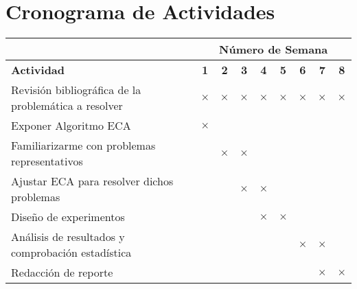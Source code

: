 \documentclass[12pt,letterpaper, xcolor=table, x11names]{article}
\newcommand{\tache}{$\boldsymbol{\times}$}
\begin{document}

\section{Cronograma de Actividades}

\begin{center}
	
\hspace{-1.0cm}
\begin{tabular}{|l|c|c|c|c|c|c|c|c|}
\hline \rowcolor{gray}
% 
&\multicolumn{8}{c}{\bf Número de Semana}\\ \hline
% 
{\bf Actividad } 
&{\bf 1}&{\bf 2}&{\bf 3}&{\bf 4} &{\bf 5}&{\bf 6}&{\bf 7}&{\bf 8} \\ \hline
Revisión bibliográfica de la problemática a resolver
& \tache  & \tache & \tache & \tache  & \tache & \tache & \tache & \tache \\ \hline
Exponer Algoritmo ECA
& \tache  &        &        &         &        &        &        &        \\ \hline
Familiarizarme con problemas representativos  
&         & \tache & \tache  &        &        &        &        &        \\ \hline
Ajustar ECA para resolver dichos problemas
&         &         & \tache & \tache &        &        &        &        \\ \hline
Diseño de experimentos
&          &        &        & \tache & \tache &        &        &        \\ \hline
Análisis de resultados y comprobación estadística
&          &        &        &        &        & \tache & \tache &        \\ \hline
Redacción de reporte
&          &        &        &        &        &        & \tache & \tache \\ \hline
\end{tabular}
\end{center}
\end{document}
